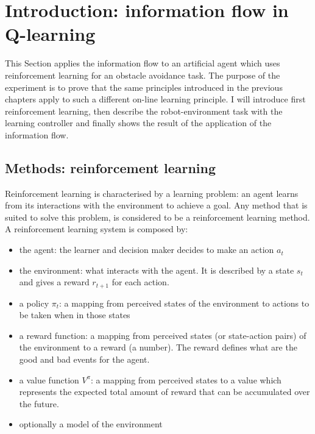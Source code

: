 \section{Introduction: information flow in Q-learning \label{Chapter7:Q learning application}}

This Section applies the information flow to an artificial agent
which uses reinforcement learning for an obstacle avoidance task.
The purpose of the experiment is to prove that the same principles introduced
in the previous chapters apply to such a different on-line learning principle.
I will introduce first reinforcement learning, then describe the
robot-environment task with the learning controller and finally shows the
result of the application of the information flow.

\subsection{Methods: reinforcement learning }

Reinforcement learning \citep{TD} is characterised by a learning problem: an agent
learns from its interactions with the environment to achieve a goal.
Any method that is suited to solve this problem, is considered to be
a reinforcement learning method.
A reinforcement learning system is composed by:
\begin{itemize}
 \item the agent: the learner and decision maker decides to make an action $a_t$
 \item the environment: what interacts with the agent. It is described by a
state $s_t$ and gives a reward $r_{t+1}$ for each action.
 \item a policy $\pi_t$: a mapping from perceived states of the environment to
actions to be taken when in those states
 \item a reward function: a mapping from perceived states (or state-action pairs)
of the environment to a reward (a number).
The reward defines what are the good and bad events for the agent.
 \item a value function $V^{\pi}$: a mapping from perceived states to a value
which represents the expected total amount of reward that can be accumulated
over the future.
 \item optionally a model of the environment
\end{itemize}

